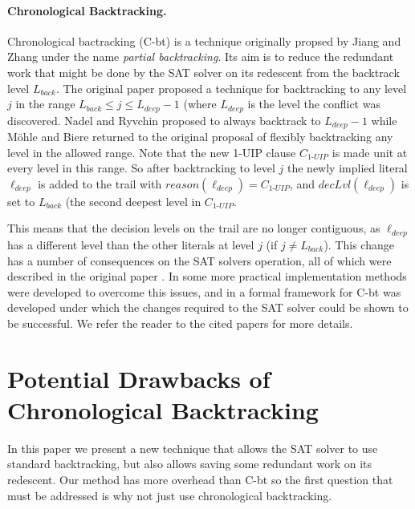 \documentclass[runningheads]{llncs}
\newcommand{\sat}{SAT\xspace}
\newcommand{\dlevel}[1]{\ensuremath{\mathit{decLvl}(#1)}}
\newcommand{\reason}[1]{\ensuremath{\mathit{reason}(#1)}}
\newcommand{\uipcls}{C_{\textit{1-UIP}}}
\newcommand{\deepestLvl}{L_{\textit{deep}}}
\newcommand{\deepestLit}{\ell_{\textit{deep}}}
\newcommand{\btL}{L_{\textit{back}}}
\newcommand{\cbt}{C-bt\xspace}
\begin{document}
\paragraph{Chronological Backtracking.}
Chronological bactracking (\cbt) is a technique originally propsed by
Jiang and Zhang \cite{DBLP:conf/lpar/JiangZ13} under the name
\textit{partial backtracking}. Its aim is to reduce the redundant work
that might be done by the \sat solver on its redescent from the
backtrack level $\btL$. The original paper proposed a technique for
backtracking to any level $j$ in the range
$\btL \leq j \leq \deepestLvl{-}1$ (where $\deepestLvl$ is the level
the conflict was discovered. Nadel and Ryvchin
\cite{DBLP:conf/sat/NadelR18} proposed to always backtrack to
$\deepestLvl{-}1$ while M{\"{o}}hle and Biere
\cite{DBLP:conf/sat/MohleB19} returned to the original proposal of
flexibly backtracking any level in the allowed range. Note that the
new 1-UIP clause $\uipcls$ is made unit at every level in this
range. So after backtracking to level $j$ the newly implied literal
$\deepestLit$ is added to the trail with
$\reason{\deepestLit}=\uipcls$, and $\dlevel{\deepestLit}$ is set to
$\btL$ (the second deepest level in $\uipcls$.

This means that the decision levels on the trail are no longer
contiguous, as $\deepestLit$ has a different level than the other
literals at level $j$ (if $j\neq \btL$). This change has a number of
consequences on the \sat solvers operation, all of which were
described in the original paper \cite{DBLP:conf/lpar/JiangZ13}. In
\cite{DBLP:conf/sat/NadelR18} some more practical implementation
methods were developed to overcome this issues, and in
\cite{DBLP:conf/sat/MohleB19} a formal framework for \cbt was
developed under which the changes required to the \sat solver could be
shown to be successful. We refer the reader to the cited papers for
more details.

\section{Potential Drawbacks of Chronological Backtracking}
In this paper we present a new technique that allows the \sat solver
to use standard backtracking, but also allows saving some redundant
work on its redescent.  Our method has more overhead than \cbt so the
first question that must be addressed is why not just use
chronological backtracking.
\end{document}
